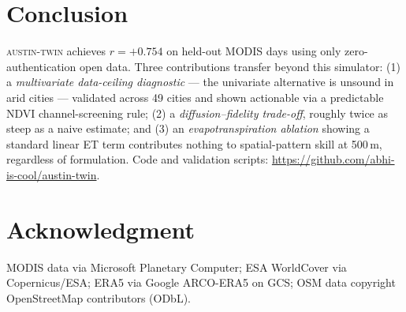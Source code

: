 \documentclass[conference]{IEEEtran}
\begin{document}
\section{Conclusion}
\textsc{austin-twin} achieves $r{=}{+}0.754$ on held-out MODIS days using
only zero-authentication open data. Three contributions transfer beyond
this simulator: (1) a \emph{multivariate data-ceiling diagnostic} — the
univariate alternative is unsound in arid cities — validated across 49
cities and shown actionable via a predictable NDVI channel-screening
rule; (2) a \emph{diffusion--fidelity trade-off}, roughly twice as steep
as a naive estimate; and (3) an \emph{evapotranspiration ablation}
showing a standard linear ET term contributes nothing to spatial-pattern
skill at 500\,m, regardless of formulation. Code and validation scripts:
\url{https://github.com/abhi-is-cool/austin-twin}.

\section*{Acknowledgment}
MODIS data via Microsoft Planetary Computer; ESA WorldCover via Copernicus/ESA;
ERA5 via Google ARCO-ERA5 on GCS; OSM data copyright OpenStreetMap contributors (ODbL).
\end{document}
